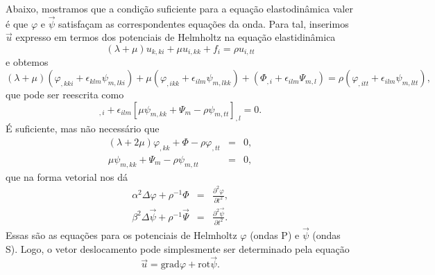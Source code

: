 Abaixo, mostramos que a condi\c{c}\~ao suficiente para a equa\c{c}\~ao
elastodin\^amica  valer \'e que $\varphi$ e $\vec{\psi}$
satisfa\c{c}am as correspondentes equa\c{c}\~oes da onda. Para tal,
inserimos $\vec{u}$ expresso em termos dos potenciais de Helmholtz
na equa\c{c}\~ao elastidin\^amica
\begin{equation}
(\lambda+\mu)u_{k,ki}+\mu u_{i,kk}+f_{i}=\rho u_{i,tt} 
\end{equation}
e obtemos
\begin{equation}
(\lambda+\mu)(\varphi_{,kki}+\epsilon_{klm}\psi_{m,lki})+\mu
(\varphi_{,ikk}+\epsilon_{ilm}\psi_{m,lkk})+(\Phi_{,i}+
\epsilon_{ilm}\Psi_{m,l})=\rho
(\varphi_{,itt}+\epsilon_{ilm}\psi_{m,ltt}) ,
\end{equation}
que pode ser reescrita como
\begin{equation}
[(\lambda+2\mu)\varphi_{,kk}+\Phi-\rho\varphi_{,tt}]_{,i}+
\epsilon_{ilm}[\mu\psi_{m,kk}+\Psi_{m}-\rho\psi_{m,tt}]_{,l}=0 .
\end{equation}
\'E suficiente, mas n\~ao necess\'ario que
\begin{eqnarray}
(\lambda+2\mu)\varphi_{,kk}+\Phi-\rho\varphi_{,tt} & = & 0, \\
\mu\psi_{m,kk}+\Psi_{m}-\rho\psi_{m,tt} & = & 0,
\end{eqnarray}
que na forma vetorial nos d\'a
\begin{eqnarray}
\alpha^{2}\Delta\varphi+\rho^{-1}\Phi & = &\frac{\partial^{2} \varphi
}{\partial t^{2}}, \\
\beta^{2}\Delta\vec{\psi}+\rho^{-1}\vec{\Psi} & = &\frac{\partial^{2}
\vec{\psi} }{\partial t^{2}}.
\end{eqnarray}
Essas s\~ao as equa\c{c}\~oes para os
potenciais de Helmholtz $\varphi$ (ondas P) e $\vec{\psi}$ (ondas S).
Logo, o vetor deslocamento pode simplesmente ser determinado pela
equa\c{c}\~ao
\begin{equation}
\vec{u}=\mbox{grad}\varphi+\mbox{rot}\vec{\psi}.
\end{equation}


%
%
%
